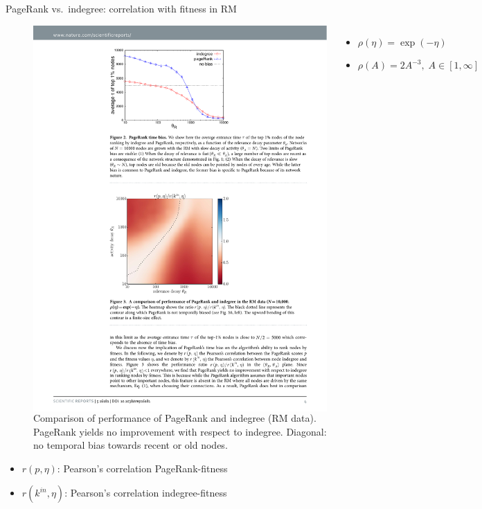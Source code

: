 \begin{frame}{PageRank vs.\ indegree: correlation with fitness in RM}
    \begin{figure}
        \begin{columns}

            \includegraphics[width=1.0\textwidth]{figures/PageRankRM_heatmap}

            \caption{Comparison of performance of PageRank and indegree (RM data). \newline
            PageRank yields no improvement with respect to indegree. \newline
            Diagonal: no temporal bias towards recent or old nodes.}
            \begin{footnotesize}
            \begin{itemize}
                \item $\rho(\eta) = \exp(-\eta)$
                \item $\rho(A) = 2A^{-3}, \; A \in [1, \infty]$
            \end{itemize}
        \end{footnotesize}
        \end{columns}
    \end{figure}
    \begin{itemize}
        \item $r(p, \eta)$: Pearson's correlation PageRank-fitness
        \item $r(k^{in}, \eta)$: Pearson's correlation indegree-fitness
    \end{itemize}
\end{frame}

